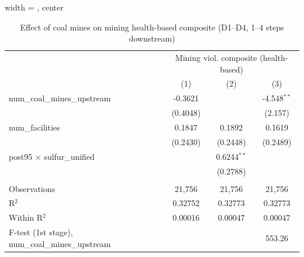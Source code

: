 
\begin{table}[htbp]
   
   \caption{\label{2sls_4step_d1_d4_mining_healthbased} Effect of coal mines on mining health-based composite (D1--D4, 1--4 steps downstream)}
   \bigskip
   
   \centering
   
   \begin{adjustbox}{width = \textwidth, center}
      
      
      \begin{tabular}{lccc}
         \toprule
         
          & \multicolumn{3}{c}{Mining viol. composite (health-based)}\\
         
                                                           & (1)           & (2)           & (3)\\  
         
         \midrule 
         num\_coal\_mines\_upstream                        & -0.3621       &               & -4.548$^{**}$\\   
                                                           & (0.4048)      &               & (2.157)\\   
         num\_facilities                                   & 0.1847        & 0.1892        & 0.1619\\   
                                                           & (0.2430)      & (0.2448)      & (0.2489)\\   
         post95 $\times$ sulfur\_unified                   &               & 0.6244$^{**}$ &   \\   
                                                           &               & (0.2788)      &   \\   
         
          \\
         
         Observations                                      & 21,756        & 21,756        & 21,756\\  
         R$^2$                                             & 0.32752       & 0.32773       & 0.32773\\  
         Within R$^2$                                      & 0.00016       & 0.00047       & 0.00047\\  
         F-test (1st stage), num\_coal\_mines\_upstream    &               &               & 553.26\\  
         

\end{tabular}
\end{adjustbox}
\end{table}
